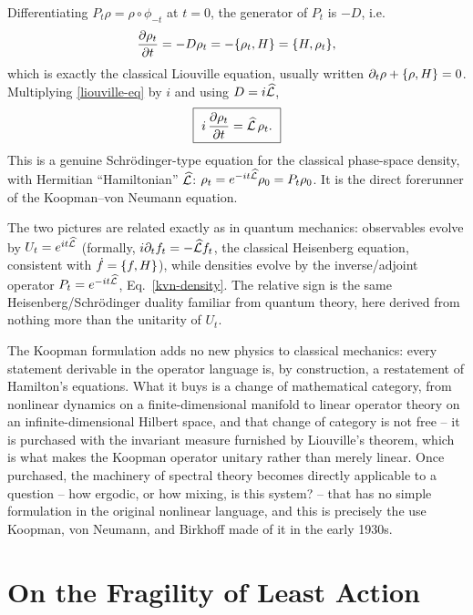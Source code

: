 Differentiating $P_t\rho = \rho\circ\phi_{-t}$ at $t=0$, the generator of $P_t$ 
is $-D$, i.e.
\begin{equation}
\frac{\partial \rho_t}{\partial t} = -D\rho_t = -\{\rho_t,H\} = 
    \{H,\rho_t\},
\label{liouville-eq}
\end{equation}
which is exactly the classical Liouville equation, usually written 
$\partial_t\rho+\{\rho,H\}=0$. Multiplying \eqref{liouville-eq} by $i$ and 
using $D=i\widehat{\mathcal{L}}$,
\begin{equation}
\boxed{\ i\,\frac{\partial \rho_t}{\partial t} = \widehat{\mathcal{L}}\,\rho_t. \ }
\label{kvn-density}
\end{equation}
This is a genuine Schr\"odinger-type equation for the classical phase-space
density, with Hermitian ``Hamiltonian'' $\widehat{\mathcal{L}}$: $\rho_t = e^{-i t \widehat{\mathcal{L}}}\rho_0 =
P_t\rho_0$. It is the direct forerunner of the Koopman--von Neumann equation. 

\begin{remark}
The two pictures are related exactly as in quantum mechanics: observables
    evolve by $U_t=e^{i t\widehat{\mathcal{L}}}$ (formally, $i\partial_tf_t = -\widehat{\mathcal{L}} f_t$, the
    classical Heisenberg equation, consistent with $\dot f=\{f,H\}$), while
    densities evolve by the inverse/adjoint operator $P_t=e^{-i t\widehat{\mathcal{L}}}$,
    Eq.~\eqref{kvn-density}. The relative sign is the same
    Heisenberg/Schr\"odinger duality familiar from quantum theory, here derived
    from nothing more than the unitarity of $U_t$.
\end{remark}

The Koopman formulation adds no new physics to classical mechanics: every
statement derivable in the operator language is, by construction, a restatement
of Hamilton's equations. What it buys is a change of mathematical category,
from nonlinear dynamics on a finite-dimensional manifold to linear operator
theory on an infinite-dimensional Hilbert space, and that change of category is
not free -- it is purchased with the invariant measure furnished by Liouville's
theorem, which is what makes the Koopman operator unitary rather than merely
linear. Once purchased, the machinery of spectral theory becomes directly
applicable to a question -- how ergodic, or how mixing, is this system? -- that
has no simple formulation in the original nonlinear language, and this is
precisely the use Koopman, von Neumann, and Birkhoff made of it in the early
1930s.
 
\section{On the Fragility of Least Action}
\label{lnf:fla}

